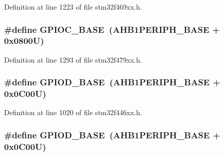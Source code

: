Definition at line 1223 of file stm32f469xx.\+h.

\subsubsection[{\texorpdfstring{G\+P\+I\+O\+C\+\_\+\+B\+A\+SE}{GPIOC_BASE}}]{\setlength{\rightskip}{0pt plus 5cm}\#define G\+P\+I\+O\+C\+\_\+\+B\+A\+SE~({\bf A\+H\+B1\+P\+E\+R\+I\+P\+H\+\_\+\+B\+A\+SE} + 0x0800\+U)}\hypertarget{group___peripheral__memory__map_ga26f267dc35338eef219544c51f1e6b3f}{}\label{group___peripheral__memory__map_ga26f267dc35338eef219544c51f1e6b3f}


Definition at line 1293 of file stm32f479xx.\+h.

\subsubsection[{\texorpdfstring{G\+P\+I\+O\+D\+\_\+\+B\+A\+SE}{GPIOD_BASE}}]{\setlength{\rightskip}{0pt plus 5cm}\#define G\+P\+I\+O\+D\+\_\+\+B\+A\+SE~({\bf A\+H\+B1\+P\+E\+R\+I\+P\+H\+\_\+\+B\+A\+SE} + 0x0\+C00\+U)}\hypertarget{group___peripheral__memory__map_ga1a93ab27129f04064089616910c296ec}{}\label{group___peripheral__memory__map_ga1a93ab27129f04064089616910c296ec}


Definition at line 1020 of file stm32f446xx.\+h.

\subsubsection[{\texorpdfstring{G\+P\+I\+O\+D\+\_\+\+B\+A\+SE}{GPIOD_BASE}}]{\setlength{\rightskip}{0pt plus 5cm}\#define G\+P\+I\+O\+D\+\_\+\+B\+A\+SE~({\bf A\+H\+B1\+P\+E\+R\+I\+P\+H\+\_\+\+B\+A\+SE} + 0x0\+C00\+U)}\hypertarget{group___peripheral__memory__map_ga1a93ab27129f04064089616910c296ec}{}\label{group___peripheral__memory__map_ga1a93ab27129f04064089616910c296ec}


